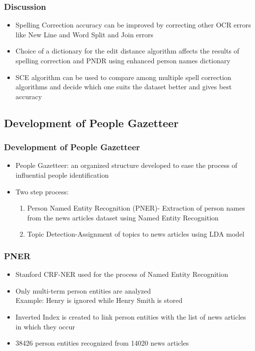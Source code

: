 \documentclass{beamer}
\begin{document}
\begin{frame}
\frametitle{Discussion}
\begin{itemize}
\item
Spelling Correction accuracy can be improved by correcting other OCR errors like New Line and Word Split and Join errors
\item
 Choice of a dictionary for the edit distance algorithm affects the results of spelling correction and PNDR using enhanced person names dictionary
\item
SCE algorithm can be used to compare among multiple spell correction algorithms and decide which one suits the dataset better and gives best accuracy

\end{itemize}
\end{frame}


\subsection{Development of People Gazetteer}
\begin{frame}
\frametitle{Development of People Gazetteer}
\begin{itemize}
\item
People Gazetteer: an organized structure developed to ease the process of influential people identification
\item
Two step process:
\begin{enumerate}
\item
Person Named Entity Recognition (PNER)-
 Extraction of person names from the news articles dataset using Named Entity Recognition
\item
Topic Detection-Assignment of topics to news articles using LDA model
\end{enumerate}
\end{itemize}
\end{frame}



\begin{frame}
\frametitle{PNER}
\begin{itemize}
\item
 Stanford CRF-NER used for the process of Named Entity Recognition 
\item
Only multi-term person entities are analyzed \\
Example: \alert {Henry} is ignored while \alert{Henry Smith} is stored
\item
Inverted Index is created to link person entities with the list of news articles in which they occur
\item
38426 person entities recognized from 14020 news articles 

\end{itemize}
\end{frame}
\end{document}
